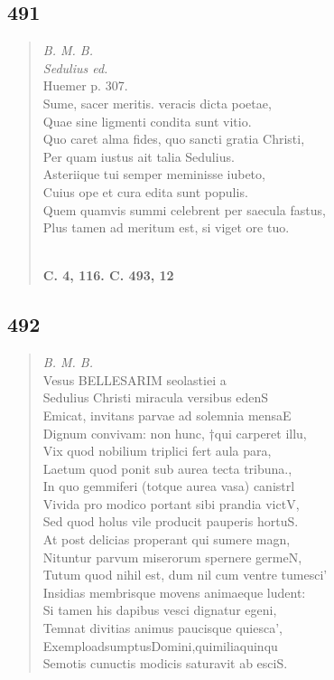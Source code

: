 \documentclass[11pt, a4paper]{report}
\begin{document}
            \subsection*{491}
      \begin{verse}
      \textit{B. M. B.} \\ \textit{Sedulius ed.} \\ Huemer p. 307. \\ Sume, sacer meritis. veracis dicta poetae, \\ Quae sine ligmenti condita sunt vitio. \\ Quo caret alma fides, quo sancti gratia Christi, \\ Per quam iustus ait talia Sedulius. \\ Asteriique tui semper meminisse iubeto, \\ Cuius ope et cura edita sunt populis. \\ Quem quamvis summi celebrent per saecula fastus, \\ Plus tamen ad meritum est, si viget ore tuo. \\ 
        ﻿\pagebreak 
    \begin{center} \textbf{C. 4, 116. C. 493, 12} \end{center} \marginpar{[49]} 
      \end{verse}
  
            \subsection*{492}
      \begin{verse}
      \textit{B. M. B.} \\ Vesus BELLESARIM seolastiei a \\ Sedulius Christi miracula versibus edenS \\ Emicat, invitans parvae ad solemnia mensaE \\ Dignum convivam: non hunc, †qui carperet illu, \\ Vix quod nobilium triplici fert aula para, \\ Laetum quod ponit sub aurea tecta tribuna., \\ In quo gemmiferi (totque aurea vasa) canistrl \\ Vivida pro modico portant sibi prandia victV, \\ Sed quod holus vile producit pauperis hortuS. \\ At post delicias properant qui sumere magn, \\ Nituntur parvum miserorum spernere germeN, \\ Tutum quod nihil est, dum nil cum ventre tumesci’ \\ Insidias membrisque movens animaeque ludent: \\ Si tamen his dapibus vesci dignatur egeni, \\ Temnat divitias animus paucisque quiesca’, \\ ExemploadsumptusDomini,quimiliaquinqu \\ Semotis cunuctis modicis saturavit ab esciS. \\ 
      \end{verse}
  
\end{document}
